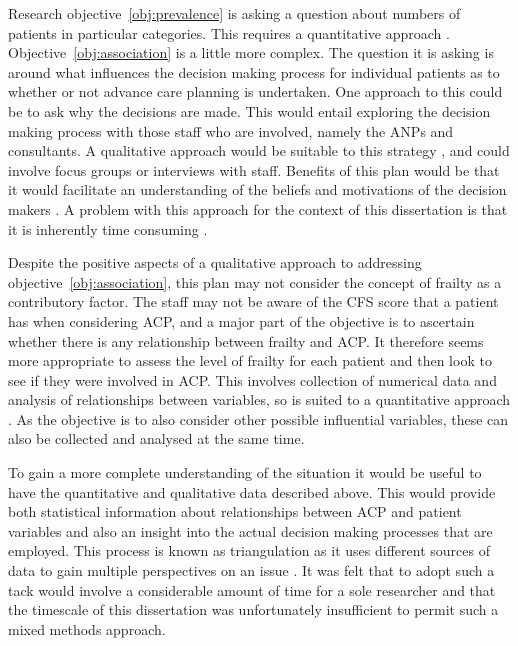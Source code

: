 \documentclass
[
	12pt,
	a4paper,
	oneside,
]{report}
\begin{document}
Research objective~\ref{obj:prevalence} is asking a question about numbers
of patients in particular categories. This requires a quantitative approach
\parencite{biggam:15}.
Objective~\ref{obj:association} is a little more complex. The question it is 
asking is around what influences the decision making process for individual
patients as to whether or not advance care planning is undertaken. One 
approach to this could be to ask why the decisions are made. This would 
entail exploring the decision making process with those staff who are 
involved, namely the ANPs and consultants. A qualitative approach would
be suitable to this strategy \parencite{jolley:13}, and could involve 
focus groups or interviews with staff. Benefits of this plan would be that it 
would facilitate an understanding of the beliefs and motivations of the 
decision makers \parencite{parahoo:14}. A problem with this approach for the
context of this dissertation is that it is inherently time consuming
\parencite{jolley:13}.

Despite the positive aspects of a qualitative approach to addressing 
objective~\ref{obj:association}, this plan may not consider the concept of 
frailty
as a contributory factor. The staff may not be aware of the CFS score
that a patient has when considering ACP, and a major part of the objective
is to ascertain whether there is any relationship between frailty and ACP.
It therefore seems more appropriate to assess the level of frailty for each
patient and then look to see if they were involved in ACP. This involves
collection of numerical data and analysis of relationships between variables, 
so is suited to a quantitative approach \parencite{parahoo:14}. As the objective
is to also consider other possible influential variables, these can also
be collected and analysed at the same time.

To gain a more complete understanding of the situation it would be useful to 
have the quantitative and qualitative data described above. This would provide
both statistical information about relationships between ACP and patient
variables and also an insight into the actual decision making processes
that are employed. This process is known as triangulation as it uses different
sources of data to gain multiple perspectives on an issue 
\parencite{biggam:15}. It was felt that to adopt such a tack would involve a 
considerable amount of time for a sole researcher and that the timescale of 
this dissertation was unfortunately insufficient to permit such a mixed 
methods approach.
\end{document}

